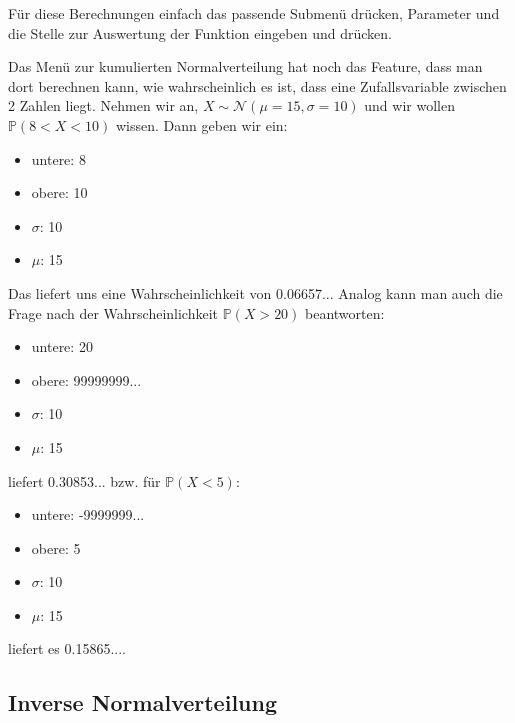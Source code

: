 \documentclass{article}
\newcommand{\taste}[1]{\fbox{\begin{varwidth}{\dimexpr\textwidth-2\fboxsep-2\fboxrule\relax}#1\end{varwidth}}}
\begin{document}
	Für diese Berechnungen einfach das passende Submenü drücken, Parameter und die Stelle zur Auswertung der Funktion eingeben und \taste{=} drücken.
	
	Das Menü zur kumulierten Normalverteilung hat noch das Feature, dass man dort berechnen kann, wie wahrscheinlich es ist, dass eine Zufallsvariable zwischen 2 Zahlen liegt. Nehmen wir an, $X\sim\mathcal{N}(\mu = 15, \sigma = 10)$ und wir wollen $\mathbb{P}(8 < X < 10)$ wissen. Dann geben wir ein:
	\begin{itemize}
		\item untere: 8
		\item obere: 10
		\item $\sigma$: 10
		\item $\mu$: 15
	\end{itemize} 
	Das liefert uns eine Wahrscheinlichkeit von 0.06657... Analog kann man auch die Frage nach der Wahrscheinlichkeit $\mathbb{P}(X > 20)$ beantworten:
	\begin{itemize}
		\item untere: 20
		\item obere: 99999999...
		\item $\sigma$: 10
		\item $\mu$: 15
	\end{itemize}
	liefert 0.30853... bzw. für $\mathbb{P}(X < 5)$:
	\begin{itemize}
		\item untere: -9999999...
		\item obere: 5
		\item $\sigma$: 10
		\item $\mu$: 15
	\end{itemize}
	liefert es 0.15865....
	
	\subsection*{Inverse Normalverteilung}
	
\end{document}
